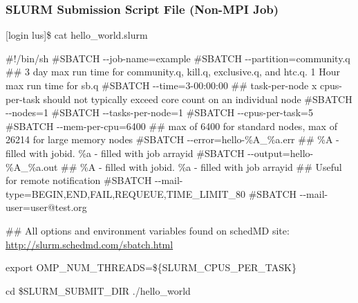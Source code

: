 \documentclass[t,hyperref={pdfpagelabels=false}]{beamer}
\newcommand{\ddash}{-{}-}
\begin{document}
\begin{frame}[fragile]
\frametitle{SLURM Submission Script File (Non-MPI Job)}
\begin{semiverbatim}\tiny
[login lus]\$ cat hello_world.slurm

\#!/bin/sh
\#SBATCH \ddash{}job-name=example
\#SBATCH \ddash{}partition=community.q
\#\# 3 day max run time for community.q, kill.q, exclusive.q, and htc.q.  1 Hour max run time for sb.q
\#SBATCH \ddash{}time=3-00:00:00
\#\# task-per-node x cpus-per-task should not typically exceed core count on an individual node 
\#SBATCH \ddash{}nodes=1
\#SBATCH \ddash{}tasks-per-node=1
\#SBATCH \ddash{}cpus-per-task=5
\#SBATCH \ddash{}mem-per-cpu=6400 \#\# max of 6400 for standard nodes, max of 26214 for large memory nodes                                                                                                                                              
\#SBATCH \ddash{}error=hello-\%A\_\%a.err \#\# \%A - filled with jobid. \%a - filled with job arrayid
\#SBATCH \ddash{}output=hello-\%A\_\%a.out \#\# \%A - filled with jobid. \%a - filled with job arrayid
\#\# Useful for remote notification
\#SBATCH \ddash{}mail-type=BEGIN,END,FAIL,REQUEUE,TIME\_LIMIT\_80
\#SBATCH \ddash{}mail-user=user@test.org

\#\# All options and environment variables found on schedMD site: \href{http://slurm.schedmd.com/sbatch.html}{http://slurm.schedmd.com/sbatch.html}

export OMP\_NUM\_THREADS=\$\{SLURM\_CPUS\_PER\_TASK\}

cd \$SLURM\_SUBMIT\_DIR
./hello\_world
\end{semiverbatim}
\end{frame}
\end{document}
